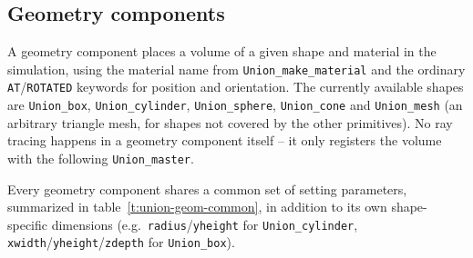 \subsection{Geometry components}
\label{sec:union-geometry}

A geometry component places a volume of a given shape and material in the
simulation, using the material name from \texttt{Union\_make\_material}
and the ordinary \texttt{AT}/\texttt{ROTATED} keywords for position and
orientation. The currently available shapes are \texttt{Union\_box},
\texttt{Union\_cylinder}, \texttt{Union\_sphere}, \texttt{Union\_cone} and
\texttt{Union\_mesh} (an arbitrary triangle mesh, for shapes not covered by
the other primitives). No ray tracing happens in a geometry component
itself -- it only registers the volume with the following
\texttt{Union\_master}.

Every geometry component shares a common set of setting parameters,
summarized in table~\ref{t:union-geom-common}, in addition to its own
shape-specific dimensions (e.g.\ \texttt{radius}/\texttt{yheight} for
\texttt{Union\_cylinder}, \texttt{xwidth}/\texttt{yheight}/\texttt{zdepth}
for \texttt{Union\_box}).

